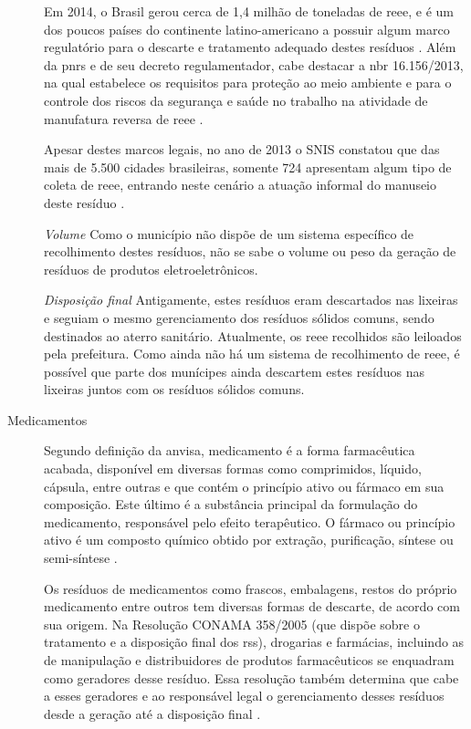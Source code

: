 \begin{description}
	Em 2014, o Brasil gerou cerca de 1,4 milhão de toneladas de \gls{reee}, e é um dos poucos países do continente latino-americano a possuir algum marco regulatório para o descarte e tratamento adequado destes resíduos \cite{WHO2015}. Além da \gls{pnrs} e de seu decreto regulamentador, cabe destacar a \gls{nbr} 16.156/2013, na qual estabelece os requisitos para proteção ao meio ambiente e para o controle dos riscos da segurança e saúde no trabalho na atividade de manufatura reversa de \gls{reee} \cite{ABNT:16156}. 
	
	Apesar destes marcos legais, no ano de 2013 o SNIS constatou que das mais de 5.500 cidades brasileiras, somente 724 apresentam algum tipo de coleta de \gls{reee}, entrando neste cenário a atuação informal do manuseio deste resíduo \cite{SNIS2014}.
	
	\subitem \textit{Volume}
	Como o município não dispõe de um sistema específico de recolhimento destes resíduos, não se sabe o volume ou peso da geração de resíduos de produtos eletroeletrônicos.
	
	\subitem \textit{Disposição final}
	Antigamente, estes resíduos eram descartados nas lixeiras e seguiam o mesmo gerenciamento dos resíduos sólidos comuns, sendo destinados ao aterro sanitário. Atualmente, os \gls{reee} recolhidos são leiloados pela prefeitura.
	Como ainda não há um sistema de recolhimento de \gls{reee}, é possível que parte dos munícipes ainda descartem estes resíduos nas lixeiras juntos com os resíduos sólidos comuns.
	
	\item[Medicamentos] Segundo definição da \gls{anvisa}, medicamento é a forma farmacêutica acabada, disponível em diversas formas como comprimidos, líquido, cápsula, entre outras e que contém o princípio ativo ou fármaco em sua composição. Este último é a substância principal da formulação do medicamento, responsável pelo efeito terapêutico. O fármaco ou princípio ativo é um composto químico obtido por extração, purificação, síntese ou semi-síntese \cite{anvisa2010}.
	
	Os resíduos de medicamentos como frascos, embalagens, restos do próprio medicamento entre outros tem diversas formas de descarte, de acordo com sua origem. Na Resolução CONAMA 358/2005 (que dispõe sobre o tratamento e a disposição final dos \gls{rss}), drogarias e farmácias, incluindo as de manipulação e distribuidores de produtos farmacêuticos se enquadram como geradores desse resíduo. Essa resolução também determina que cabe a esses geradores e ao responsável legal o gerenciamento desses resíduos desde a geração até a disposição final \cite{conama:358}.
	

\end{description}
